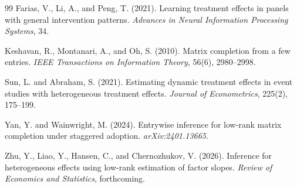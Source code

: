 \documentclass[11pt]{article}
\theoremstyle{definition}
\theoremstyle{plain}
\theoremstyle{remark}
\begin{document}
\begin{thebibliography}{99}
Farias, V., Li, A., and Peng, T. (2021).
Learning treatment effects in panels with general intervention patterns.
\emph{Advances in Neural Information Processing Systems}, 34.

Keshavan, R., Montanari, A., and Oh, S. (2010).
Matrix completion from a few entries.
\emph{IEEE Transactions on Information Theory}, 56(6), 2980--2998.

Sun, L. and Abraham, S. (2021).
Estimating dynamic treatment effects in event studies with heterogeneous treatment effects.
\emph{Journal of Econometrics}, 225(2), 175--199.

Yan, Y. and Wainwright, M. (2024).
Entrywise inference for low-rank matrix completion under staggered adoption.
\emph{arXiv:2401.13665}.

Zhu, Y., Liao, Y., Hansen, C., and Chernozhukov, V. (2026).
Inference for heterogeneous effects using low-rank estimation of factor slopes.
\emph{Review of Economics and Statistics}, forthcoming.
\end{thebibliography}
\end{document}
